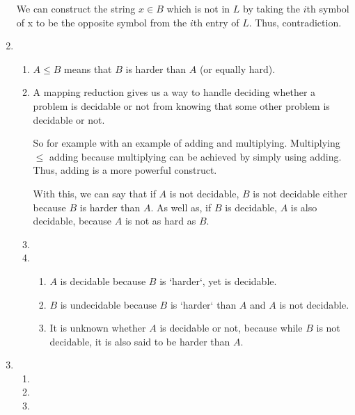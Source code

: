 \documentclass{article}
\begin{document}
\begin{enumerate}
            We can construct the string $x \in B$ which is not in $L$ by taking the $i$th symbol of x to be the opposite symbol from the $i$th entry of $L$. Thus, contradiction.
    \item %
        \begin{enumerate}
            \item
            	$A \leq B$ means that $B$ is harder than $A$ (or equally hard).
            \item
            	A mapping reduction gives us a way to handle deciding whether a problem is decidable or not from knowing that some other problem is decidable or not.

                So for example with an example of adding and multiplying.
                Multiplying $\leq$ adding because multiplying can be achieved by simply using adding. Thus, adding is a more powerful construct.

                With this, we can say that if $A$ is not decidable, $B$ is not decidable either because $B$ is harder than $A$. As well as, if $B$ is decidable, $A$ is also decidable, because $A$ is not as hard as $B$.
            \item

            \item
              \begin{enumerate}
                  \item $A$ is decidable because $B$ is `harder`, yet is decidable.
                  \item $B$ is undecidable because $B$ is `harder` than $A$ and $A$ is not decidable.
                  \item It is unknown whether $A$ is decidable or not, because while $B$ is not decidable, it is also said to be harder than $A$.
              \end{enumerate}
        \end{enumerate}
    \item %
        \begin{enumerate}
            \item
            \item
            \item
        \end{enumerate}
\end{enumerate}
\end{document}
